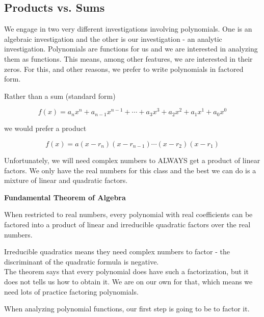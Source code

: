\documentclass{ximera}
\begin{document}
\subsection{Products vs. Sums}


We engage in two very different investigations involving polynomials.  One is an algebraic investigation and the other is our investigation - an analytic investigation.  Polynomials are functions for us and we are interested in analyzing them as functions.  This means, among other features, we are interested in their zeros.  For this, and other reasons, we prefer to write polynomials in factored form.



Rather than a sum (standard form)

\[   f(x) = a_n x^n + a_{n-1} x^{n-1} + \cdots + a_3 x^3 + a_2 x^2 + a_1 x^1 + a_0 x^0      \]

we would prefer a product

\[   f(x) = a (x-r_n)(x-r_{n-1})  \cdots (x-r_2)(x-r_1)  \]





Unfortunately, we will need complex numbers to ALWAYS get a product of linear factors.  We only have the real numbers for this class and the best we can do is a mixture of linear and quadratic factors.



\begin{theorem} \textbf{\textcolor{green!50!black}{Fundamental Theorem of Algebra}}

When restricted to real numbers, every polynomial with real coefficients can be factored into a product of linear and irreducible quadratic factors over the real numbers.

\end{theorem}


Irreducible quadratics means they need complex numbers to factor - the discriminant of the quadratic formula is negative. \\



The theorem says that every polynomial does have such a factorization, but it does not tells us how to obtain it.  We are on our own for that, which means we need lots of practice factoring polynomials.

When analyzing polynomial functions, our first step is going to be to factor it.
\end{document}
